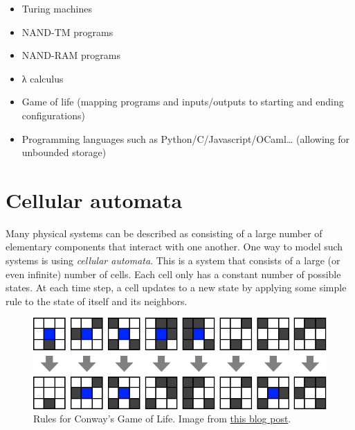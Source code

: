\begin{itemize}
\tightlist
\item
  Turing machines
\item
  NAND-TM programs
\item
  NAND-RAM programs
\item
  λ calculus
\item
  Game of life (mapping programs and inputs/outputs to starting and
  ending configurations)
\item
  Programming languages such as Python/C/Javascript/OCaml\ldots{}
  (allowing for unbounded storage)
\end{itemize}

\section{Cellular automata}\label{cellularautomatasec}

Many physical systems can be described as consisting of a large number
of elementary components that interact with one another. One way to
model such systems is using \emph{cellular automata}. This is a system
that consists of a large (or even infinite) number of cells. Each cell
only has a constant number of possible states. At each time step, a cell
updates to a new state by applying some simple rule to the state of
itself and its neighbors.


\begin{figure}
\centering
\includegraphics[width=\textwidth, height=0.25\paperheight, keepaspectratio]{../figure/conwaysgrids.png}
\caption{Rules for Conway's Game of Life. Image from
\href{https://mblogscode.wordpress.com/2017/06/07/python-simulation-coding-conways-game-of-life/}{this
blog post}.}
\label{gameofliferulesfig}
\end{figure}

